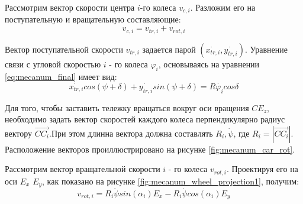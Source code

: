 \documentclass[oneside,final,14pt]{extreport}
\begin{document}
\begin{figure}[H]
\end{figure}

Рассмотрим вектор скорости центра $i$-го колеса $v_{c,i}$. Разложим его на поступательную и вращательную составляющие:
\begin{equation}
\label{eq:mec_wheel_v_decomp}
v_{c,i}
=
v_{tr,i}
+
v_{rot,i}
\end{equation}

Вектор поступательной скорости $v_{tr,i}$ задается парой $(\dot{x_{tr,i}},\dot{y_{tr,i}})$. Уравнение связи с угловой скоростью $i$ - го колеса $\varphi_{i}$, основываясь на уравнении \ref{eq:mecanum_final} имеет вид:
\begin{equation}
\dot{x_{tr,i}}
cos(\psi+\delta)
+
\dot{y_{tr,i}}
sin(\psi+\delta)
=
R\dot{\varphi_{i}}
cos\delta
\end{equation}

Для того, чтобы заставить тележку вращаться вокруг оси вращения $CE_{z}$, необходимо задать вектор скоростей каждого колеса перпендикулярно радиус вектору $\overrightarrow{C C_{i}}$.При этом длинна вектора должна составлять $R_{i},\dot{\psi}$, где $R_{i}=|\overrightarrow{C C_{i}}|$. Расположение векторов проиллюстрировано на  рисунке \ref{fig:mecanum_car_rot}.

\begin{figure}[H]
\end{figure}

Рассмотрим вектор вращательной скорости $i$ - го колеса $v_{rot,i}$. Проектируя его на оси $E_{x}$ $E_{y}$, как показано на рисунке \ref{fig:mecanum_wheel_projection1}, получим:
\begin{equation}
v_{rot,i}
=
R_{i}
\dot{\psi}
sin(\alpha_{i})
E_{x}
-
R_{i}
\dot{\psi}
cos(\alpha_{i})
E_{y}
\end{equation}

\begin{figure}[H]
\end{figure}
\end{document}
